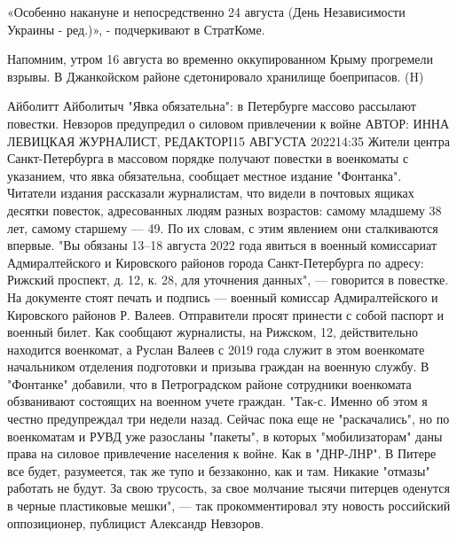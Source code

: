 «Особенно накануне и непосредственно 24 августа (День Независимости Украины - ред.)», - подчеркивают в СтратКоме.

Напомним, утром 16 августа во временно оккупированном Крыму прогремели взрывы. В Джанкойском районе сдетонировало хранилище боеприпасов. 
(H)

Айболитт Айболитыч
"Явка обязательна": в Петербурге массово рассылают повестки. Невзоров предупредил о силовом привлечении к войне
АВТОР: ИННА ЛЕВИЦКАЯ ЖУРНАЛИСТ, РЕДАКТОРI15 АВГУСТА 202214:35
Жители центра Санкт-Петербурга в массовом порядке получают повестки в военкоматы с указанием, что явка обязательна, сообщает местное издание "Фонтанка". Читатели издания рассказали журналистам, что видели в почтовых ящиках десятки повесток, адресованных людям разных возрастов: самому младшему 38 лет, самому старшему — 49. По их словам, с этим явлением они сталкиваются впервые.
"Вы обязаны 13–18 августа 2022 года явиться в военный комиссариат Адмиралтейского и Кировского районов города Санкт-Петербурга по адресу: Рижский проспект, д. 12, к. 28, для уточнения данных", — говорится в повестке. На документе стоят печать и подпись — военный комиссар Адмиралтейского и Кировского районов Р. Валеев. Отправители просят принести с собой паспорт и военный билет.
Как сообщают журналисты, на Рижском, 12, действительно находится военкомат, а Руслан Валеев с 2019 года служит в этом военкомате начальником отделения подготовки и призыва граждан на военную службу. В "Фонтанке" добавили, что в Петроградском районе сотрудники военкомата обзванивают состоящих на военном учете граждан.
"Так-с. Именно об этом я честно предупреждал три недели назад. Сейчас пока еще не "раскачались", но по военкоматам и РУВД уже разосланы "пакеты", в которых "мобилизаторам" даны права на силовое привлечение населения к войне. Как в "ДНР-ЛНР". В Питере все будет, разумеется, так же тупо и беззаконно, как и там. Никакие "отмазы" работать не будут. За свою трусость, за свое молчание тысячи питерцев оденутся в черные пластиковые мешки", — так прокомментировал эту новость российский оппозиционер, публицист Александр Невзоров.
